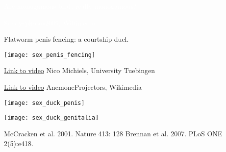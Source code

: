 \documentclass[t]{beamer}
\newcommand{\backskip}{\vspace{-0.5\baselineskip}}
\begin{document}

{
\begin{frame}{\textcolor{white}{Are monogamous birds really monogamous?}}

\vfilll

\tiny \textcolor{white}{Sandysphotos2009, Wikimedia}
\end{frame}
}


\begin{frame}{Flatworm penis fencing: a courtship duel.}

\backskip

\centering

\texttt{[image: sex\_penis\_fencing]}

\vfilll

\tiny \href{http://www.youtube.com/watch?v=5fx-YgcP8Gg}{Link to video} \hfill Nico Michiels, University Tuebingen


\end{frame}


{
\begin{frame}

\vfilll

\tiny \href{https://www.youtube.com/watch?v=dQs1cw25dqw}{Link to video} \hfill AnemoneProjectors, Wikimedia
\end{frame}
}


\begin{frame}

\begin{multicols}{2}

\centering

\texttt{[image: sex\_duck\_penis]}

\columnbreak

\texttt{[image: sex\_duck\_genitalia]}

\end{multicols}

\vfilll

\tiny McCracken et al. 2001. Nature 413: 128
\hfill 
Brennan et al. 2007. PLoS ONE 2(5):e418. 

\end{frame}

\end{document}
